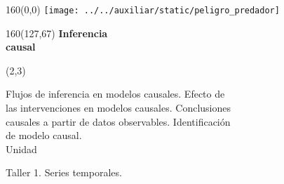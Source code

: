 \documentclass[shownotes,aspectratio=169]{beamer}
\newcounter{capitulo}
\newcommand{\unidad}{\thecapitulo \stepcounter{capitulo}}
\begin{document}
\begin{frame}

\begin{textblock}{160}(0,0)
\texttt{[image: ../../auxiliar/static/peligro\_predador]}
\end{textblock}

\begin{textblock}{160}(127,67)
\LARGE \textcolor{black!5}{\fontsize{22}{0}\selectfont \textbf{Inferencia  \\[-0.1cm] \hspace{0.5cm} causal}}
\end{textblock}

\begin{textblock}{55}(2,3)
\begin{turn}{0}
\parbox{15cm}{\small
\textcolor{black!95}{Flujos de inferencia en modelos causales. Efecto de}\\
\textcolor{black!95}{las intervenciones en modelos causales. Conclusiones} \\
\textcolor{black!95}{causales a partir de datos observables. Identificación} \\
\textcolor{black!95}{de modelo causal.} \\
\normalsize\textcolor{black!95}{Unidad \unidad} \\
}
\end{turn}
\end{textblock}

\end{frame}



\begin{frame}

\centering \LARGE
Taller 1. Series temporales.

\end{frame}
\end{document}

